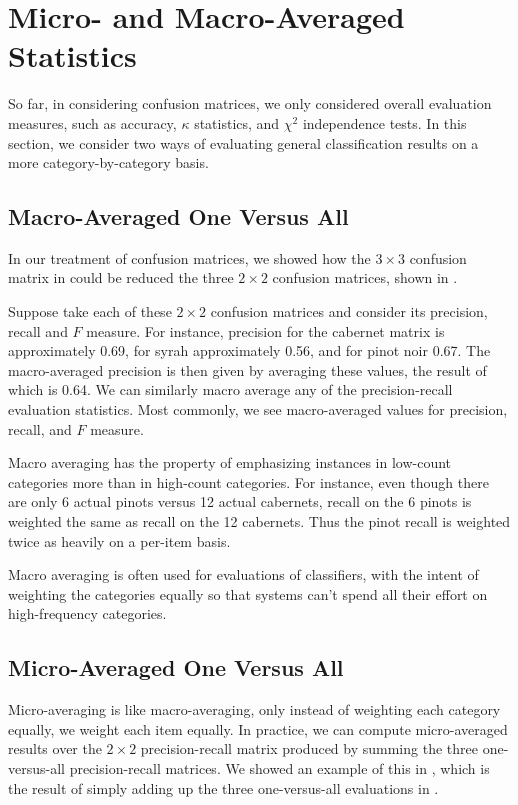 \section{Micro- and Macro-Averaged Statistics}\label{section:classifier-eval-macro-avg}

So far, in considering confusion matrices, we only considered overall
evaluation measures, such as accuracy, $\kappa$ statistics, and
$\chi^2$ independence tests.  In this section, we consider two 
ways of evaluating general classification results on a more
category-by-category basis.

\subsection{Macro-Averaged One Versus All}

In our treatment of confusion matrices, we showed how the $3 \times 3$
confusion matrix in  could be reduced the
three $2 \times 2$ confusion matrices, shown in
.

Suppose take each of these $2 \times 2$ confusion matrices and
consider its precision, recall and $F$ measure.  For instance,
precision for the cabernet matrix is approximately 0.69, for syrah
approximately 0.56, and for pinot noir 0.67.  The macro-averaged
precision is then given by averaging these values, the result of which
is 0.64.  We can similarly macro average any of the precision-recall
evaluation statistics.  Most commonly, we see macro-averaged values
for precision, recall, and $F$ measure.

Macro averaging has the property of emphasizing instances in low-count
categories more than in high-count categories.  For instance, even
though there are only 6 actual pinots versus 12 actual cabernets,
recall on the 6 pinots is weighted the same as recall on the 12
cabernets.  Thus the pinot recall is weighted twice as heavily
on a per-item basis.

Macro averaging is often used for evaluations of classifiers, with the
intent of weighting the categories equally so that systems can't spend
all their effort on high-frequency categories.


\subsection{Micro-Averaged One Versus All}

Micro-averaging is like macro-averaging, only instead of weighting
each category equally, we weight each item equally.  In practice, we
can compute micro-averaged results over the $2 \times 2$
precision-recall matrix produced by summing the three one-versus-all
precision-recall matrices.  We showed an example of this in
, which is the result of simply adding up the
three one-versus-all evaluations in
.

